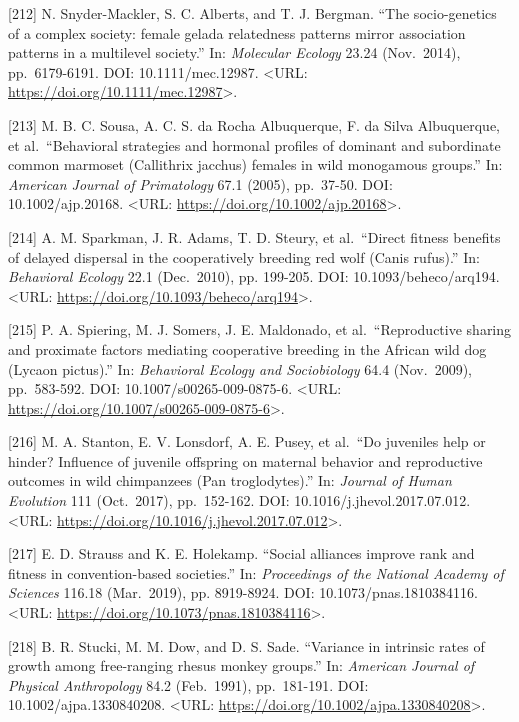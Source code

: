 \documentclass[
]{article}
\begin{document}
{[}212{]} N. Snyder-Mackler, S. C. Alberts, and T. J. Bergman. ``The
socio-genetics of a complex society: female gelada relatedness patterns
mirror association patterns in a multilevel society.'' In:
\emph{Molecular Ecology} 23.24 (Nov.~2014), pp.~6179-6191. DOI:
10.1111/mec.12987. \textless URL:
\url{https://doi.org/10.1111/mec.12987}\textgreater.

{[}213{]} M. B. C. Sousa, A. C. S. da Rocha Albuquerque, F. da Silva
Albuquerque, et al.~``Behavioral strategies and hormonal profiles of
dominant and subordinate common marmoset (Callithrix jacchus) females in
wild monogamous groups.'' In: \emph{American Journal of Primatology}
67.1 (2005), pp.~37-50. DOI: 10.1002/ajp.20168. \textless URL:
\url{https://doi.org/10.1002/ajp.20168}\textgreater.

{[}214{]} A. M. Sparkman, J. R. Adams, T. D. Steury, et al.~``Direct
fitness benefits of delayed dispersal in the cooperatively breeding red
wolf (Canis rufus).'' In: \emph{Behavioral Ecology} 22.1 (Dec.~2010),
pp. 199-205. DOI: 10.1093/beheco/arq194. \textless URL:
\url{https://doi.org/10.1093/beheco/arq194}\textgreater.

{[}215{]} P. A. Spiering, M. J. Somers, J. E. Maldonado, et
al.~``Reproductive sharing and proximate factors mediating cooperative
breeding in the African wild dog (Lycaon pictus).'' In: \emph{Behavioral
Ecology and Sociobiology} 64.4 (Nov.~2009), pp.~583-592. DOI:
10.1007/s00265-009-0875-6. \textless URL:
\url{https://doi.org/10.1007/s00265-009-0875-6}\textgreater.

{[}216{]} M. A. Stanton, E. V. Lonsdorf, A. E. Pusey, et al.~``Do
juveniles help or hinder? Influence of juvenile offspring on maternal
behavior and reproductive outcomes in wild chimpanzees (Pan
troglodytes).'' In: \emph{Journal of Human Evolution} 111 (Oct.~2017),
pp.~152-162. DOI: 10.1016/j.jhevol.2017.07.012. \textless URL:
\url{https://doi.org/10.1016/j.jhevol.2017.07.012}\textgreater.

{[}217{]} E. D. Strauss and K. E. Holekamp. ``Social alliances improve
rank and fitness in convention-based societies.'' In: \emph{Proceedings
of the National Academy of Sciences} 116.18 (Mar.~2019), pp. 8919-8924.
DOI: 10.1073/pnas.1810384116. \textless URL:
\url{https://doi.org/10.1073/pnas.1810384116}\textgreater.

{[}218{]} B. R. Stucki, M. M. Dow, and D. S. Sade. ``Variance in
intrinsic rates of growth among free-ranging rhesus monkey groups.'' In:
\emph{American Journal of Physical Anthropology} 84.2 (Feb.~1991),
pp.~181-191. DOI: 10.1002/ajpa.1330840208. \textless URL:
\url{https://doi.org/10.1002/ajpa.1330840208}\textgreater.
\end{document}
